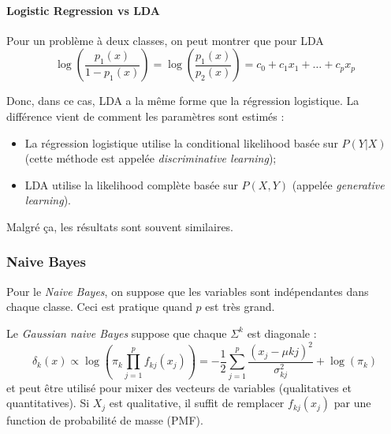         \paragraph{Logistic Regression vs LDA}
            Pour un problème à deux classes, on peut montrer que pour LDA
            \[
                \log\left(\frac{p_1(x)}{1 - p_1(x)}\right) = \log\left(\frac{p_1(x)}{p_2(x)}\right) = c_0 + c_1 x_1 + \dots + c_p x_p
            \]

            Donc, dans ce cas, LDA a la même forme que la régression logistique. La différence vient de comment les paramètres sont estimés :
            \begin{itemize}
                \item La régression logistique utilise la conditional likelihood basée sur \(P(Y | X)\) (cette méthode est appelée \textit{discriminative learning});
                \item LDA utilise la likelihood complète basée sur \(P(X, Y)\) (appelée \textit{generative learning}).
            \end{itemize}
            Malgré ça, les résultats sont souvent similaires.

    \subsubsection{Naive Bayes}
        \begin{definition}
            Pour le \textit{Naive Bayes}, on suppose que les variables sont indépendantes dans chaque classe. Ceci est pratique quand \(p\) est très grand.

            Le \textit{Gaussian naive Bayes} suppose que chaque \(\Sigma^k\) est diagonale :
            \[
                \delta_k(x) \propto \log\left(\pi_k \prod_{j=1}^p f_{kj}(x_j)\right) = - \frac{1}{2} \sum_{j=1}^p \frac{(x_j - \mu{kj})^2}{\sigma_{kj}^2} + \log(\pi_k)
            \]
            et peut être utilisé pour mixer des vecteurs de variables (qualitatives et quantitatives). Si \(X_j\) est qualitative, il suffit de remplacer \(f_{kj}(x_j)\) par une function de probabilité de masse (PMF).
        \end{definition}